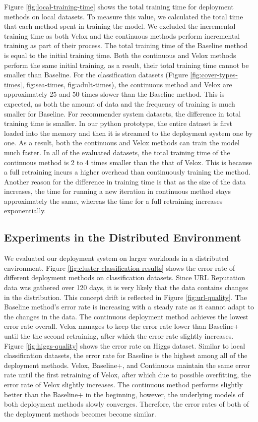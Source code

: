 \documentclass{vldb}
\begin{document}
{\color{green}Figure  \ref{fig:local-training-time} shows the total training time for deployment methods on local datasets.
To measure this value, we calculated the total time that each method spent in training the model.
We excluded the incremental training time as both Velox and the continuous methods perform incremental training as part of their process.
The total training time of the Baseline method is equal to the initial training time.
Both the continuous and Velox methods perform the same initial training, as a result, their total training time cannot be smaller than Baseline.
For the classification datasets (Figure \ref{fig:cover-types-times}, {fig:sea-times}, {fig:adult-times}), the continuous method and Velox are approximately 25 and 50 times slower than the Baseline method.
This is expected, as both the amount of data and the frequency of training is much smaller for Baseline.
For recommender system datasets, the difference in total training time is smaller.
In our python prototype, the entire dataset is first loaded into the memory and then it is streamed to the deployment system one by one.
As a result, both the continuous and Velox methods can train the model much faster.
In all of the evaluated datasets, the total training time of the continuous method is 2 to 4 times smaller than the that of Velox.
This is because a full retraining incurs a higher overhead than continuously training the method.
Another reason for the difference in training time is that as the size of the data increases, the time for running a new iteration in continuous method stays approximately the same, whereas the time for a full retraining increases exponentially.}

\subsection{Experiments in the Distributed Environment}
We evaluated our deployment system on larger workloads in a distributed environment.
Figure \ref{fig:cluster-classification-results} shows the error rate of different deployment methods on classification datasets.
Since URL Reputation data was gathered over 120 days, it is very likely that the data contains changes in the distribution.
This concept drift is reflected in Figure \ref{fig:url-quality}.
The Baseline method's error rate is increasing with a steady rate as it cannot adapt to the changes in the data.
The continuous deployment method achieves the lowest error rate overall.
Velox manages to keep the error rate lower than Baseline+ until the the second retraining, after which the error rate slightly increases. 
Figure \ref{fig:higgs-quality} shows the error rate on Higgs dataset.
Similar to local classification datasets, the error rate for Baseline is the highest among all of the deployment methods.
Velox, Baseline+, and Continuous maintain the same error rate until the first retraining of Velox, after which due to possible overfitting, the error rate of Velox slightly increases.
The continuous method performs slightly better than the Baseline+ in the beginning, however, the underlying models of both deployment methods slowly converges.
Therefore, the error rates of both of the deployment methods becomes become similar.
\end{document}
